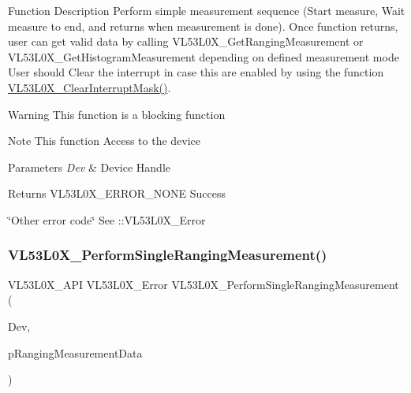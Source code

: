 \begin{DoxyParagraph}{Function Description}
Perform simple measurement sequence (Start measure, Wait measure to end, and returns when measurement is done). Once function returns, user can get valid data by calling V\+L53\+L0\+X\+\_\+\+Get\+Ranging\+Measurement or V\+L53\+L0\+X\+\_\+\+Get\+Histogram\+Measurement depending on defined measurement mode User should Clear the interrupt in case this are enabled by using the function \hyperlink{group__VL53L0X__interrupt__group_gaa84b2cf5cd87b118b9a43e7ae764447e}{V\+L53\+L0\+X\+\_\+\+Clear\+Interrupt\+Mask()}.
\end{DoxyParagraph}
\begin{DoxyWarning}{Warning}
This function is a blocking function
\end{DoxyWarning}
\begin{DoxyNote}{Note}
This function Access to the device
\end{DoxyNote}

\begin{DoxyParams}{Parameters}
{\em Dev} & Device Handle \\
\hline
\end{DoxyParams}
\begin{DoxyReturn}{Returns}
V\+L53\+L0\+X\+\_\+\+E\+R\+R\+O\+R\+\_\+\+N\+O\+NE Success 

\char`\"{}\+Other error code\char`\"{} See \+::\+V\+L53\+L0\+X\+\_\+\+Error 
\end{DoxyReturn}
\mbox{\label{group__VL53L0X__measurement__group_gae81888494fb896a4a8922f16832291c1}} 
\subsubsection{\texorpdfstring{V\+L53\+L0\+X\+\_\+\+Perform\+Single\+Ranging\+Measurement()}{VL53L0X\_PerformSingleRangingMeasurement()}}
{\footnotesize\ttfamily V\+L53\+L0\+X\+\_\+\+A\+PI V\+L53\+L0\+X\+\_\+\+Error V\+L53\+L0\+X\+\_\+\+Perform\+Single\+Ranging\+Measurement (\begin{DoxyParamCaption}\item[{\hyperlink{group__VL53L0X__platform__group_ga2d6405308b1dd524b462f1b8fb97d167}{V\+L53\+L0\+X\+\_\+\+D\+EV}}]{Dev,  }\item[{\hyperlink{structVL53L0X__RangingMeasurementData__t}{V\+L53\+L0\+X\+\_\+\+Ranging\+Measurement\+Data\+\_\+t} $\ast$}]{p\+Ranging\+Measurement\+Data }\end{DoxyParamCaption})}




